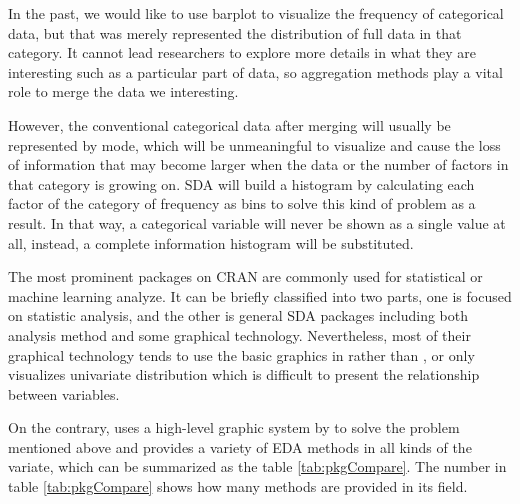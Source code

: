 \documentclass[article]{jss}
\begin{document}
In the past, we would like to use barplot to visualize the frequency of categorical data, but that was merely represented the distribution of full data in that category. It cannot lead researchers to explore more details in what they are interesting such as a particular part of data, so aggregation methods play a vital role to merge the data we interesting.

However, the conventional categorical data after merging will usually be represented by mode, which will be unmeaningful to visualize and cause the loss of information that may become larger when the data or the number of factors in that category is growing on. SDA will build a histogram by calculating each factor of the category of frequency as bins to solve this kind of problem as a result. In that way, a categorical variable will never be shown as a single value at all, instead, a complete information histogram will be substituted.




The most prominent packages on CRAN are commonly used for statistical or machine learning analyze. It can be briefly classified into two parts, one is focused on statistic analysis, and the other is general SDA packages including both analysis method and some graphical technology. Nevertheless, most of their graphical technology tends to use the basic graphics in  rather than , or only visualizes univariate distribution which is difficult to present the relationship between variables. 

On the contrary,  uses a high-level graphic system by  to solve the problem mentioned above and provides a variety of EDA methods in all kinds of the variate, which can be summarized as the table \ref{tab:pkgCompare}. The number in table \ref{tab:pkgCompare} shows how many methods are provided in its field.
\end{document}
